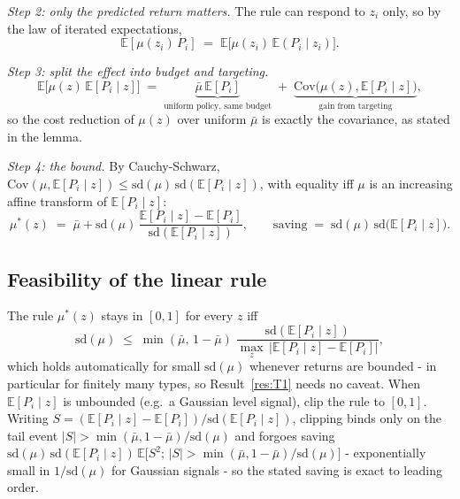\documentclass[11pt]{article}
\theoremstyle{remark}
\newcommand{\E}{\mathbb{E}}
\newcommand{\Cov}{\mathrm{Cov}}
\begin{document}
\emph{Step 2: only the predicted return matters.} The rule can respond to $z_i$ only, so by the law of iterated expectations,
\begin{equation}
\E[\mu(z_i)\,P_i]\;=\;\E\bigl[\mu(z_i)\,\E(P_i\mid z_i)\bigr].
\end{equation}

\emph{Step 3: split the effect into budget and targeting.}
\begin{equation}
\E\bigl[\mu(z)\,\E[P_i\mid z]\bigr]
\;=\;
\underbrace{\bar\mu\,\E[P_i]}_{\text{uniform policy, same budget}}
\;+\;
\underbrace{\Cov\bigl(\mu(z),\E[P_i\mid z]\bigr)}_{\text{gain from targeting}} ,
\end{equation}
so the cost reduction of $\mu(z)$ over uniform $\bar\mu$ is exactly the covariance, as stated in the lemma.

\emph{Step 4: the bound.} By Cauchy-Schwarz, $\Cov(\mu,\E[P_i\mid z])\le\mathrm{sd}(\mu)\,\mathrm{sd}(\E[P_i\mid z])$, with equality iff $\mu$ is an increasing affine transform of $\E[P_i\mid z]$:
\begin{equation}
\mu^*(z)\;=\;\bar\mu+\mathrm{sd}(\mu)\,\frac{\E[P_i\mid z]-\E[P_i]}{\mathrm{sd}(\E[P_i\mid z])},
\qquad
\text{saving}\;=\;\mathrm{sd}(\mu)\,\mathrm{sd}\bigl(\E[P_i\mid z]\bigr).
\end{equation}

\subsection*{Feasibility of the linear rule}

The rule $\mu^*(z)$ stays in $[0,1]$ for every $z$ iff
\begin{equation}
\mathrm{sd}(\mu)\;\le\;\min(\bar\mu,\,1-\bar\mu)\;\frac{\mathrm{sd}(\E[P_i\mid z])}{\max_z\,\bigl|\E[P_i\mid z]-\E[P_i]\bigr|},
\end{equation}
which holds automatically for small $\mathrm{sd}(\mu)$ whenever returns are bounded - in particular for finitely many types, so Result~\ref{res:T1} needs no caveat.
When $\E[P_i\mid z]$ is unbounded (e.g.\ a Gaussian level signal), clip the rule to $[0,1]$.
Writing $S=(\E[P_i\mid z]-\E[P_i])/\mathrm{sd}(\E[P_i\mid z])$, clipping binds only on the tail event $|S|>\min(\bar\mu,1-\bar\mu)/\mathrm{sd}(\mu)$ and forgoes saving $\mathrm{sd}(\mu)\,\mathrm{sd}(\E[P_i\mid z])\,\E\bigl[S^2;\,|S|>\min(\bar\mu,1-\bar\mu)/\mathrm{sd}(\mu)\bigr]$ - exponentially small in $1/\mathrm{sd}(\mu)$ for Gaussian signals - so the stated saving is exact to leading order.
\end{document}
